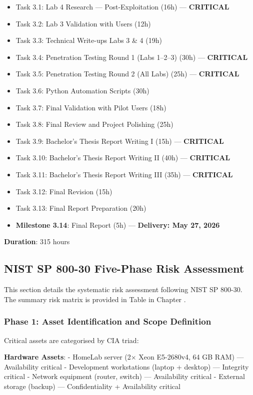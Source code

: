 \begin{itemize}
\tightlist
\item
  Task 3.1: Lab 4 Research --- Post-Exploitation (16h) --- \textbf{CRITICAL}
\item
  Task 3.2: Lab 3 Validation with Users (12h)
\item
  Task 3.3: Technical Write-ups Labs 3 \& 4 (19h)
\item
  Task 3.4: Penetration Testing Round 1 (Labs 1--2--3) (30h) --- \textbf{CRITICAL}
\item
  Task 3.5: Penetration Testing Round 2 (All Labs) (25h) --- \textbf{CRITICAL}
\item
  Task 3.6: Python Automation Scripts (30h)
\item
  Task 3.7: Final Validation with Pilot Users (18h)
\item
  Task 3.8: Final Review and Project Polishing (25h)
\item
  Task 3.9: Bachelor's Thesis Report Writing I (15h) --- \textbf{CRITICAL}
\item
  Task 3.10: Bachelor's Thesis Report Writing II (40h) --- \textbf{CRITICAL}
\item
  Task 3.11: Bachelor's Thesis Report Writing III (35h) --- \textbf{CRITICAL}
\item
  Task 3.12: Final Revision (15h)
\item
  Task 3.13: Final Report Preparation (20h)
\item
  \textbf{Milestone 3.14}: Final Report (5h) --- \textbf{Delivery: May 27, 2026}
\end{itemize}

\textbf{Duration}: 315 hours

\subsection{NIST SP 800-30 Five-Phase Risk Assessment}

This section details the systematic risk assessment following NIST SP 800-30. The summary risk matrix is provided in Table in Chapter .

\subsubsection{Phase 1: Asset Identification and Scope Definition}

Critical assets are categorised by CIA triad:

\textbf{Hardware Assets}: - HomeLab server (2× Xeon E5-2680v4, 64 GB RAM) --- Availability critical - Development workstations (laptop + desktop) --- Integrity critical - Network equipment (router, switch) --- Availability critical - External storage (backup) --- Confidentiality + Availability critical

